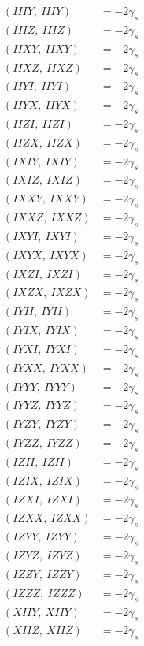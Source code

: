 \documentclass{article}
\begin{document}
\begin{align*}
  (IIIY,\ IIIY) &= - 2 \gamma_{s} \\
  (IIIZ,\ IIIZ) &= - 2 \gamma_{s} \\
  (IIXY,\ IIXY) &= - 2 \gamma_{s} \\
  (IIXZ,\ IIXZ) &= - 2 \gamma_{s} \\
  (IIYI,\ IIYI) &= - 2 \gamma_{s} \\
  (IIYX,\ IIYX) &= - 2 \gamma_{s} \\
  (IIZI,\ IIZI) &= - 2 \gamma_{s} \\
  (IIZX,\ IIZX) &= - 2 \gamma_{s} \\
  (IXIY,\ IXIY) &= - 2 \gamma_{s} \\
  (IXIZ,\ IXIZ) &= - 2 \gamma_{s} \\
  (IXXY,\ IXXY) &= - 2 \gamma_{s} \\
  (IXXZ,\ IXXZ) &= - 2 \gamma_{s} \\
  (IXYI,\ IXYI) &= - 2 \gamma_{s} \\
  (IXYX,\ IXYX) &= - 2 \gamma_{s} \\
  (IXZI,\ IXZI) &= - 2 \gamma_{s} \\
  (IXZX,\ IXZX) &= - 2 \gamma_{s} \\
  (IYII,\ IYII) &= - 2 \gamma_{s} \\
  (IYIX,\ IYIX) &= - 2 \gamma_{s} \\
  (IYXI,\ IYXI) &= - 2 \gamma_{s} \\
  (IYXX,\ IYXX) &= - 2 \gamma_{s} \\
  (IYYY,\ IYYY) &= - 2 \gamma_{s} \\
  (IYYZ,\ IYYZ) &= - 2 \gamma_{s} \\
  (IYZY,\ IYZY) &= - 2 \gamma_{s} \\
  (IYZZ,\ IYZZ) &= - 2 \gamma_{s} \\
  (IZII,\ IZII) &= - 2 \gamma_{s} \\
  (IZIX,\ IZIX) &= - 2 \gamma_{s} \\
  (IZXI,\ IZXI) &= - 2 \gamma_{s} \\
  (IZXX,\ IZXX) &= - 2 \gamma_{s} \\
  (IZYY,\ IZYY) &= - 2 \gamma_{s} \\
  (IZYZ,\ IZYZ) &= - 2 \gamma_{s} \\
  (IZZY,\ IZZY) &= - 2 \gamma_{s} \\
  (IZZZ,\ IZZZ) &= - 2 \gamma_{s} \\
  (XIIY,\ XIIY) &= - 2 \gamma_{s} \\
  (XIIZ,\ XIIZ) &= - 2 \gamma_{s} \\

\end{align*}
\end{document}
